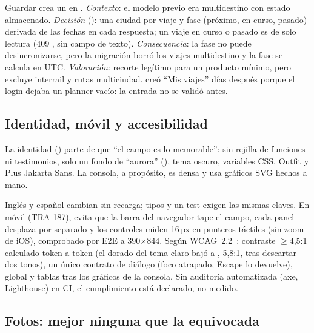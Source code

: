 Guardar crea un  en . \emph{Contexto}: el modelo
previo era multidestino con estado almacenado. \emph{Decisión} (): una ciudad por viaje
y fase (próximo, en curso, pasado) derivada de las fechas en cada respuesta; un viaje en curso o
pasado es de solo lectura (409 , sin campo de texto). \emph{Consecuencia}: la
fase no puede desincronizarse, pero la migración borró los viajes multidestino y la fase se
calcula en UTC. \emph{Valoración}: recorte legítimo para un producto mínimo, pero excluye interrail y rutas
multiciudad.  creó ``Mis viajes'' días después porque el login dejaba un planner
vacío: la entrada no se validó antes.

\subsection{Identidad, móvil y accesibilidad}

La identidad () parte de que ``el campo es lo memorable'':
sin rejilla de funciones ni testimonios, solo un fondo de ``aurora'' (), tema
oscuro, variables CSS, Outfit y Plus Jakarta Sans. La consola, a propósito, es densa y usa
gráficos SVG hechos a mano.

Inglés y español cambian sin recarga; tipos y un test exigen las mismas claves. En móvil (TRA-187),  evita que la barra del navegador tape el campo, cada panel
desplaza por separado y los controles miden 16\,px en punteros táctiles (sin zoom de iOS),
comprobado por E2E a 390$\times$844.
Según WCAG~2.2~\cite{fe:wcag22}: contraste $\geq$4,5:1 calculado token a token
(el dorado del tema claro bajó a , 5,8:1, tras descartar dos tonos), un único
contrato de diálogo (foco atrapado, Escape lo devuelve),  global y
tablas  tras los gráficos de la consola. Sin auditoría automatizada (axe,
Lighthouse) en CI, el cumplimiento está declarado, no medido.

\subsection{Fotos: mejor ninguna que la equivocada}

